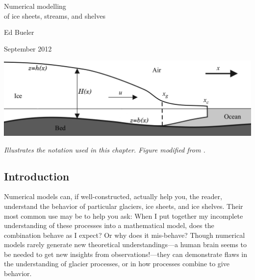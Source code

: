 \documentclass[titlepage,letterpaper,final,12pt]{scrartcl}
\begin{document}
\graphicspath{{../photos/}{../pdffigs/}}


\begin{titlepage}

  \begin{center}
    {\Large{} Numerical modelling \\ of ice sheets, streams, and shelves}
    \vspace{0.5cm}

    {\large Ed Bueler}
    \vspace{1cm}

    September 2012

    \vfill
    
    \includegraphics[width=6.0in]{flowline}
  
    \scriptsize \emph{Illustrates the notation used in this chapter.  Figure modified from \cite{SchoofMarine1}.} \normalsize
    
    \vspace{2.0in}
  \end{center}
\end{titlepage}


\clearpage\newpage
\setcounter{section}{1}
\subsection{Introduction}

Numerical models can, if well-constructed, actually help you, the reader, understand the behavior of particular glaciers, ice sheets, and ice shelves.  Their most common use may be to help you ask: When I put together my incomplete understanding of these processes into a mathematical model, does the combination behave as I expect?  Or why does it mis-behave?  Though numerical models rarely generate new theoretical understandings---a human brain seems to be needed to get new insights from observations!---they can demonstrate flaws in the understanding of glacier processes, or in how processes combine to give behavior.
\end{document}
